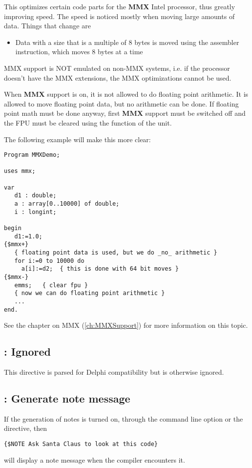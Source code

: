 This optimizes certain code parts for the \textbf{MMX} Intel
processor, thus greatly improving speed. The speed is noticed mostly when
moving large amounts of data. Things that change are
\begin{itemize}
\item Data with a size that is a multiple of 8 bytes is moved using the
 assembler instruction, which moves 8 bytes at a time
\end{itemize}
\begin{remark}MMX support is NOT emulated on non-MMX systems, i.e. if
the processor doesn't have the MMX extensions, the MMX optimizations cannot
be used.
\end{remark}
When \textbf{MMX} support is on, it is not allowed to do floating point
arithmetic. It is allowed to move floating point data, but no arithmetic
can be done. If floating point math must be done anyway, first \textbf{MMX}
 support must be switched off and the FPU must be cleared using the 
function of the  unit.

The following example will make this more clear:
\begin{verbatim}
Program MMXDemo;

uses mmx;

var
   d1 : double;
   a : array[0..10000] of double;
   i : longint;

begin
   d1:=1.0;
{$mmx+}
   { floating point data is used, but we do _no_ arithmetic }
   for i:=0 to 10000 do
     a[i]:=d2;  { this is done with 64 bit moves }
{$mmx-}
   emms;   { clear fpu }
   { now we can do floating point arithmetic }
   ...
end.
\end{verbatim}
See the chapter on MMX (\ref{ch:MMXSupport}) for more information
on this topic.

\subsection{ : Ignored}
This directive is parsed for Delphi compatibility but is otherwise ignored.

\subsection{ : Generate note message}

If the generation of notes is turned on, through the  command line
option or the  directive, then
\begin{verbatim}
{$NOTE Ask Santa Claus to look at this code}
\end{verbatim}
will display a note message when the compiler encounters it.



